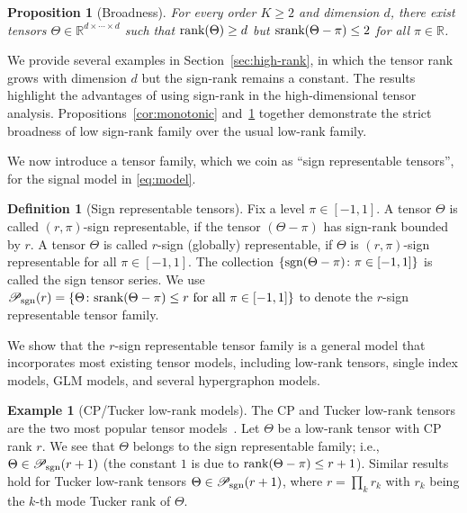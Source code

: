 \documentclass[11pt]{article}
\theoremstyle{plain}
\newtheorem{prop}{Proposition}
\theoremstyle{definition}
\newtheorem{defn}{Definition}
\newtheorem{example}{Example}
\def\sign{\textup{sgn}}
\def\srank{\textup{srank}}
\def\rank{\textup{rank}}
\def\caliP{\mathscr{P}_{\textup{sgn}}}
\begin{document}
\begin{prop}[Broadness]\label{prop:extention}\label{cor:broadness}For every order $K\geq 2$ and dimension $d$, there exist tensors $\Theta\in\mathbb{R}^{d\times \cdots \times d}$ such that $\rank(\Theta)\geq d$ but $\srank(\Theta-\pi)\leq 2$ for all $\pi\in\mathbb{R}$.  
\end{prop}
We provide several examples in Section~\ref{sec:high-rank}, in which the tensor rank grows with dimension $d$ but the sign-rank remains a constant. The results highlight the advantages of using sign-rank in the high-dimensional tensor analysis. Propositions~\ref{cor:monotonic} and~\ref{prop:extention} together demonstrate the strict broadness of low sign-rank family over the usual low-rank family. 

We now introduce a tensor family, which we coin as ``sign representable tensors'', for the signal model in \eqref{eq:model}.\\
\begin{defn}[Sign representable tensors] 
Fix a level $\pi\in[-1,1]$. A tensor $\Theta$ is called $(r,\pi)$-sign representable, if the tensor $(\Theta-\pi)$ has sign-rank bounded by $r$. A tensor $\Theta$ is called $r$-sign (globally) representable, if $\Theta$ is $(r,\pi)$-sign representable for all $\pi\in[-1,1]$. The collection $\{\sign(\Theta-\pi)\colon \pi \in[-1,1]\}$ is called the sign tensor series. 
We use $\caliP(r)=\{\Theta\colon \srank(\Theta-\pi)\leq r \text{ for all }\pi\in[-1,1]\}$ to denote the $r$-sign representable tensor family.
\end{defn}

We show that the $r$-sign representable tensor family is a general model that incorporates most existing tensor models, including low-rank tensors, single index models, GLM models, and several hypergraphon models. \\

\begin{example}[CP/Tucker low-rank models] The CP and Tucker low-rank tensors are the two most popular tensor models~\citep{kolda2009tensor}. Let $\Theta$ be a low-rank tensor with CP rank $r$. We see that $\Theta$ belongs to the sign representable family; i.e., $\Theta\in\caliP(r+1)$ (the constant $1$ is due to $\rank(\Theta-\pi)\leq r+1$). Similar results hold for Tucker low-rank tensors $\Theta\in\caliP(r+1)$, where $r=\prod_kr_k$ with $r_k$ being the $k$-th mode Tucker rank of $\Theta$.  \\
\end{example} 
\end{document}
